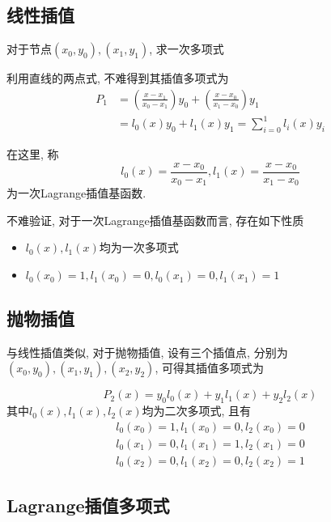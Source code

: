 \subsection{线性插值}

\begin{example}
    对于节点$(x_0,y_0),(x_1,y_1)$, 求一次多项式
\end{example}

\begin{solution}
    利用直线的两点式, 不难得到其插值多项式为
    \begin{align*}
        P_1 &= \left(\frac{x-x_1}{x_0-x_1}\right)y_0+\left(\frac{x-x_0}{x_1-x_0}\right)y_1\\
        &=l_0(x)y_0+l_1(x)y_1=\sum_{i=0}^1l_i(x)y_i
    \end{align*}
\end{solution}

在这里, 称
\begin{equation*}
    l_0(x)=\frac{x-x_0}{x_0-x_1}, l_1(x) = \frac{x-x_0}{x_1-x_0}
\end{equation*}
为一次Lagrange插值基函数.

不难验证, 对于一次Lagrange插值基函数而言, 存在如下性质
\begin{itemize}
    \item $l_0(x), l_1(x)$均为一次多项式
    \item $l_0(x_0)=1, l_1(x_0)=0, l_0(x_1)=0, l_1(x_1)=1$
\end{itemize}

\subsection{抛物插值}

与线性插值类似, 对于抛物插值, 设有三个插值点, 分别为$(x_0,y_0),(x_1,y_1),(x_2,y_2)$, 可得其插值多项式为

\begin{equation*}
    P_2(x)=y_0l_0(x)+y_1l_1(x)+y_2l_2(x)
\end{equation*}
其中$l_0(x),l_1(x),l_2(x)$均为二次多项式, 且有
\begin{align*}
    l_0(x_0)=1,l_1(x_0)=0,l_2(x_0)=0\\
    l_0(x_1)=0,l_1(x_1)=1,l_2(x_1)=0\\
    l_0(x_2)=0,l_1(x_2)=0,l_2(x_2)=1
\end{align*}

\subsection{Lagrange插值多项式}

